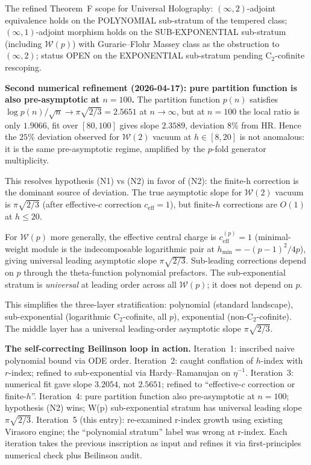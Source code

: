 \documentclass[11pt]{article}
\newcommand{\cW}{\mathcal{W}}
\begin{document}
The refined Theorem~F scope for Universal Holography:
$(\infty,2)$-adjoint equivalence holds on the POLYNOMIAL
sub-stratum of the tempered class; $(\infty,1)$-adjoint
morphism holds on the SUB-EXPONENTIAL sub-stratum (including
$\cW(p)$) with Gurarie--Flohr Massey class as the obstruction to
$(\infty,2)$; status OPEN on the EXPONENTIAL sub-stratum pending
C$_2$-cofinite rescoping.

\textbf{Second numerical refinement (2026-04-17): pure partition
function is also pre-asymptotic at $n=100$.} The partition function
$p(n)$ satisfies $\log p(n)/\sqrt n \to \pi\sqrt{2/3}=2.5651$ at
$n\to\infty$, but at $n=100$ the local ratio is only $1.9066$, fit
over $[80,100]$ gives slope $2.3589$, deviation $8\%$ from HR.
Hence the $25\%$ deviation observed for $\cW(2)$ vacuum at
$h\in[8,20]$ is not anomalous: it is the same pre-asymptotic
regime, amplified by the $p$-fold generator multiplicity.

This resolves hypothesis (N1) vs (N2) in favor of (N2): the finite-h
correction is the dominant source of deviation. The true asymptotic
slope for $\cW(2)$ vacuum is $\pi\sqrt{2/3}$ (after effective-$c$
correction $c_{\mathrm{eff}}=1$), but finite-$h$ corrections are
$O(1)$ at $h\le 20$.

For $\cW(p)$ more generally, the effective central charge is
$c_{\mathrm{eff}}^{(p)}=1$ (minimal-weight module is the
indecomposable logarithmic pair at $h_{\mathrm{min}}=-(p-1)^2/4p$),
giving universal leading asymptotic slope $\pi\sqrt{2/3}$.
Sub-leading corrections depend on $p$ through the theta-function
polynomial prefactors. The sub-exponential stratum is \emph{universal}
at leading order across all $\cW(p)$; it does not depend on $p$.

This simplifies the three-layer stratification: polynomial (standard
landscape), sub-exponential (logarithmic C$_2$-cofinite, all $p$),
exponential (non-C$_2$-cofinite). The middle layer has a universal
leading-order asymptotic slope $\pi\sqrt{2/3}$.

\textbf{The self-correcting Beilinson loop in action.}
Iteration~1: inscribed naive polynomial bound via ODE order.
Iteration~2: caught conflation of $h$-index with $r$-index; refined
to sub-exponential via Hardy--Ramanujan on $\eta^{-1}$.
Iteration~3: numerical fit gave slope $3.2054$, not $2.5651$; refined
to ``effective-$c$ correction or finite-$h$''.
Iteration~4: pure partition function also pre-asymptotic
at $n=100$; hypothesis (N2) wins; W(p) sub-exponential stratum has
universal leading slope $\pi\sqrt{2/3}$.
Iteration~5 (this entry): re-examined r-index growth using existing
Virasoro engine; the ``polynomial stratum'' label was wrong at r-index.
Each iteration takes the previous inscription as input and refines it
via first-principles numerical check plus Beilinson audit.
\end{document}
